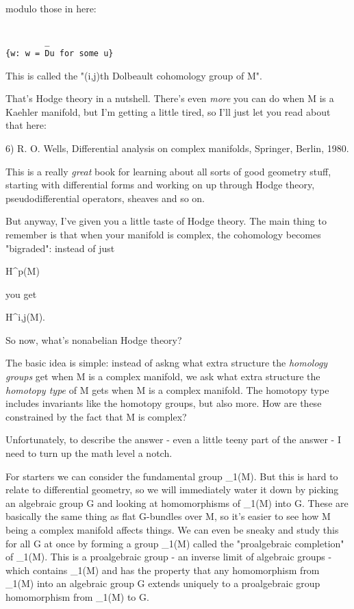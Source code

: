 modulo those in here:

\begin{verbatim}

        _
{w: w = Du for some u}
\end{verbatim}
    
This is called the "(i,j)th Dolbeault cohomology group of M".

That's Hodge theory in a nutshell.  There's even \emph{more} you can
do when M is a Kaehler manifold, but I'm getting a little tired,
so I'll just let you read about that here:

6) R. O. Wells, Differential analysis on complex manifolds, 
Springer, Berlin, 1980.

This is a really \emph{great} book for learning about all sorts of good
geometry stuff, starting with differential forms and working on up
through Hodge theory, pseudodifferential operators, sheaves and so on.

But anyway, I've given you a little taste of Hodge theory.
The main thing to remember is that when your manifold is complex,
the cohomology becomes "bigraded": instead of just

H^{p}(M)

you get

H^{i,j}(M).

So now, what's nonabelian Hodge theory?

The basic idea is simple: instead of askng what extra structure the
\emph{homology groups} get when M is a complex manifold, we ask what
extra structure the \emph{homotopy type} of M gets when M is a complex
manifold.  The homotopy type includes invariants like the homotopy
groups, but also more.  How are these constrained by the fact that
M is complex?

Unfortunately, to describe the answer - even a little teeny part of the
answer - I need to turn up the math level a notch.

For starters we can consider the fundamental group \pi _{1}(M).
But this is hard to relate to differential geometry, so we will
immediately water it down by picking an algebraic group G and looking at
homomorphisms of \pi _{1}(M) into G.  These are basically the same
thing as flat G-bundles over M, so it's easier to see how M being a
complex manifold affects things.  We can even be sneaky and study this
for all G at once by forming a group \Pi _{1}(M) called the
"proalgebraic completion" of \pi _{1}(M).  This is a
proalgebraic group - an inverse limit of algebraic groups - which 
contains \pi _{1}(M) and has the property that any homomorphism
from \pi _{1}(M) into an algebraic group G extends uniquely to a
proalgebraic group homomorphism from \Pi _{1}(M) to G.

